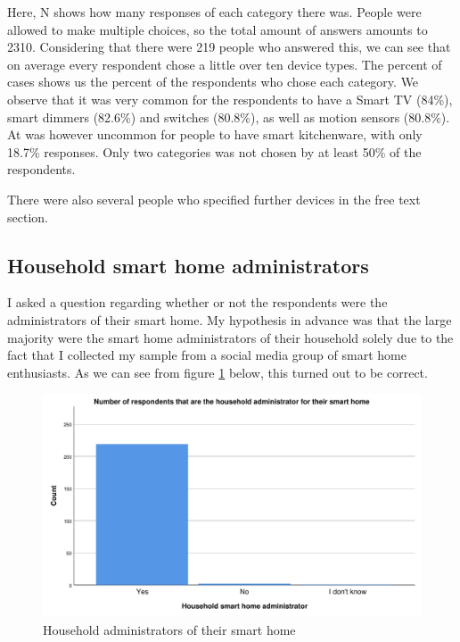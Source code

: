 Here, N shows how many responses of each category there was. People were allowed to make multiple choices, so the total amount of answers amounts to 2310. Considering that there were 219 people who answered this, we can see that on average every respondent chose a little over ten device types. The percent of cases shows us the percent of the respondents who chose each category. We observe that it was very common for the respondents to have a Smart TV (84\%), smart dimmers (82.6\%) and switches (80.8\%), as well as motion sensors (80.8\%). At was however uncommon for people to have smart kitchenware, with only 18.7\% responses. Only two categories was not chosen by at least 50\% of the respondents. 

There were also several people who specified further devices in the free text section. 


\subsection{Household smart home administrators}
I asked a question regarding whether or not the respondents were the administrators of their smart home. My hypothesis in advance was that the large majority were the smart home administrators of their household solely due to the fact that I collected my sample from a social media group of smart home enthusiasts. As we can see from figure \ref{fig:administrator} below, this turned out to be correct. 

\begin{figure}[!h]
    \centering
    \includegraphics[scale=0.55]{figures/diagrams/administrator.pdf}
    \caption{Household administrators of their smart home}
    \label{fig:administrator}
\end{figure}

